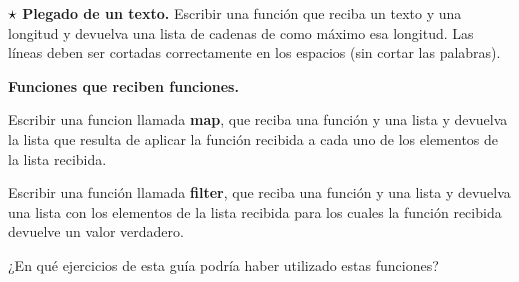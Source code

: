 \begin{ejercicio}
$\dificil$ {\bf Plegado de un texto.} Escribir una función que reciba un texto y una
longitud y devuelva una lista de cadenas de como máximo esa longitud. Las
líneas deben ser cortadas correctamente en los espacios (sin cortar las
palabras).
\end{ejercicio}


\begin{ejercicio}
{\bf Funciones que reciben funciones.}
\begin{partes}
\item Escribir una funcion llamada {\bf map}, que reciba una función y una
lista y devuelva la lista que resulta de aplicar la función recibida a
cada uno de los elementos de la lista recibida.
\item Escribir una función llamada {\bf filter}, que reciba una función y
una lista y devuelva una lista con los elementos de la lista recibida para
los cuales la función recibida devuelve un valor verdadero.
\item ¿En qué ejercicios de esta guía podría haber utilizado estas
funciones?
\end{partes}
\end{ejercicio}

